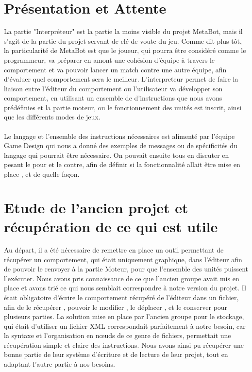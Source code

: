 \documentclass{report}
\begin{document}
\section{Présentation et Attente}
La partie "Interpréteur" est la partie la moins visible du projet MetaBot,
mais il s'agit de la partie du projet servant de clé de voute du jeu.
Comme dit plus tôt, la particularité de MetaBot est que le joueur, qui pourra être considéré comme le programmeur, va préparer en amont une cohésion d'équipe à travers le comportement et va pouvoir lancer un match contre une autre équipe, afin d'évaluer quel comportement sera le meilleur.
L'interpreteur permet de faire la liaison entre l'éditeur du comportement ou l'utilisateur va développer son comportement, en utilisant un ensemble de d'instructions que nous avons prédéfinies  et la partie moteur, ou le fonctionnement des unités est inscrit, ainsi que les différents modes de jeux.
\paragraph{}
Le langage et l'ensemble des instructions nécessaires est alimenté par l'équipe Game Design qui nous a donné des exemples de messages ou de spécificités du langage qui pourrait être nécessaire. On pouvait ensuite tous en discuter en pesant le pour et le contre, afin de définir si la fonctionnalité allait être mise en place , et de quelle façon.
\section{Etude de l'ancien projet et récupération de ce qui est utile}
Au départ, il a été nécessaire de remettre en place un outil permettant de récupérer un comportement, qui était uniquement graphique, dans l'éditeur afin de pouvoir le renvoyer à la partie Moteur, pour que l'ensemble des unités puissent l'exécuter.
Nous avons pris connaissance de ce que l'ancien groupe avait mis en place et avons trié ce qui nous semblait correspondre à notre version du projet.
Il était obligatoire d'écrire le comportement récupéré de l'éditeur dans un fichier, afin de le récupérer , pouvoir le modifier , le déplacer , et le conserver pour plusieurs parties.
La solution mise en place par l'ancien groupe pour le stockage, qui était d'utiliser un fichier XML correspondait parfaitement à notre besoin, car la syntaxe et l'organisation en nœuds de ce genre de fichiers, permettait une récupération simple et claire des instructions. Nous avons ainsi pu récupérer une bonne partie de leur système d'écriture et de lecture de leur projet, tout en adaptant l'autre partie à nos besoins.
\end{document}
